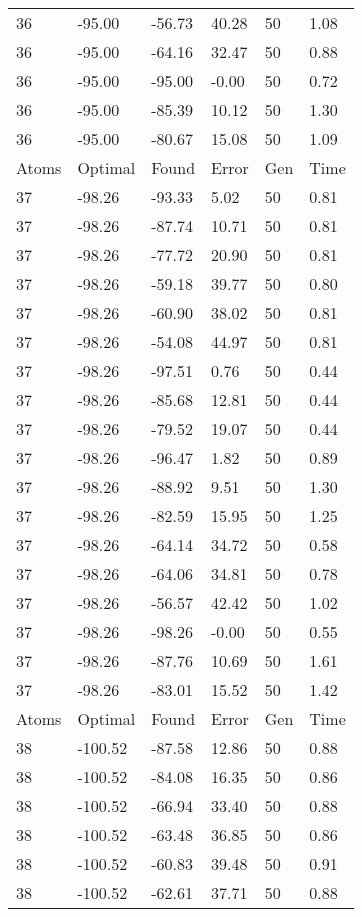 \documentclass{report}
\begin{document}
\begin{appendix}
\begin{longtable}{llllll}
36 & -95.00 & -56.73 & 40.28 & 50 & 1.08 \\
36 & -95.00 & -64.16 & 32.47 & 50 & 0.88 \\
36 & -95.00 & -95.00 & -0.00 & 50 & 0.72 \\
36 & -95.00 & -85.39 & 10.12 & 50 & 1.30 \\
36 & -95.00 & -80.67 & 15.08 & 50 & 1.09 \\
Atoms & Optimal & Found & Error & Gen & Time \\
37 & -98.26 & -93.33 & 5.02 & 50 & 0.81 \\
37 & -98.26 & -87.74 & 10.71 & 50 & 0.81 \\
37 & -98.26 & -77.72 & 20.90 & 50 & 0.81 \\
37 & -98.26 & -59.18 & 39.77 & 50 & 0.80 \\
37 & -98.26 & -60.90 & 38.02 & 50 & 0.81 \\
37 & -98.26 & -54.08 & 44.97 & 50 & 0.81 \\
37 & -98.26 & -97.51 & 0.76 & 50 & 0.44 \\
37 & -98.26 & -85.68 & 12.81 & 50 & 0.44 \\
37 & -98.26 & -79.52 & 19.07 & 50 & 0.44 \\
37 & -98.26 & -96.47 & 1.82 & 50 & 0.89 \\
37 & -98.26 & -88.92 & 9.51 & 50 & 1.30 \\
37 & -98.26 & -82.59 & 15.95 & 50 & 1.25 \\
37 & -98.26 & -64.14 & 34.72 & 50 & 0.58 \\
37 & -98.26 & -64.06 & 34.81 & 50 & 0.78 \\
37 & -98.26 & -56.57 & 42.42 & 50 & 1.02 \\
37 & -98.26 & -98.26 & -0.00 & 50 & 0.55 \\
37 & -98.26 & -87.76 & 10.69 & 50 & 1.61 \\
37 & -98.26 & -83.01 & 15.52 & 50 & 1.42 \\
Atoms & Optimal & Found & Error & Gen & Time \\
38 & -100.52 & -87.58 & 12.86 & 50 & 0.88 \\
38 & -100.52 & -84.08 & 16.35 & 50 & 0.86 \\
38 & -100.52 & -66.94 & 33.40 & 50 & 0.88 \\
38 & -100.52 & -63.48 & 36.85 & 50 & 0.86 \\
38 & -100.52 & -60.83 & 39.48 & 50 & 0.91 \\
38 & -100.52 & -62.61 & 37.71 & 50 & 0.88 \\

\end{longtable}
\end{appendix}
\end{document}
